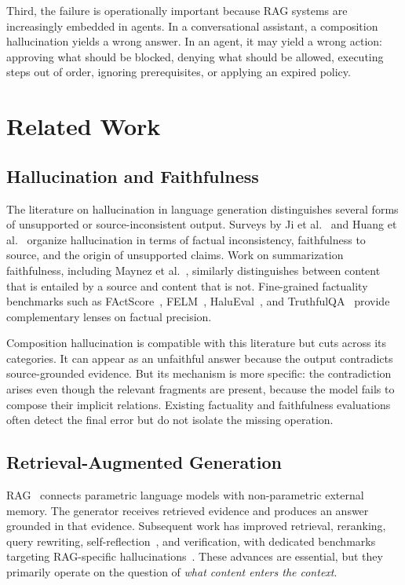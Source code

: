 \documentclass[11pt]{article}
\begin{document}
Third, the failure is operationally important because RAG systems are increasingly embedded in agents. In a conversational assistant, a composition hallucination yields a wrong answer. In an agent, it may yield a wrong action: approving what should be blocked, denying what should be allowed, executing steps out of order, ignoring prerequisites, or applying an expired policy.

\section{Related Work}

\subsection{Hallucination and Faithfulness}

The literature on hallucination in language generation distinguishes several forms of unsupported or source-inconsistent output. Surveys by Ji et al.~\cite{ji2023survey} and Huang et al.~\cite{huang2023hallucination} organize hallucination in terms of factual inconsistency, faithfulness to source, and the origin of unsupported claims. Work on summarization faithfulness, including Maynez et al.~\cite{maynez2020faithfulness}, similarly distinguishes between content that is entailed by a source and content that is not. Fine-grained factuality benchmarks such as FActScore~\cite{min2023factscore}, FELM~\cite{chen2023felm}, HaluEval~\cite{li2023halueval}, and TruthfulQA~\cite{lin2022truthfulqa} provide complementary lenses on factual precision.

Composition hallucination is compatible with this literature but cuts across its categories. It can appear as an unfaithful answer because the output contradicts source-grounded evidence. But its mechanism is more specific: the contradiction arises even though the relevant fragments are present, because the model fails to compose their implicit relations. Existing factuality and faithfulness evaluations often detect the final error but do not isolate the missing operation.

\subsection{Retrieval-Augmented Generation}

RAG~\cite{lewis2020rag} connects parametric language models with non-parametric external memory. The generator receives retrieved evidence and produces an answer grounded in that evidence. Subsequent work has improved retrieval, reranking, query rewriting, self-reflection~\cite{asai2024selfrag}, and verification, with dedicated benchmarks targeting RAG-specific hallucinations~\cite{niu2024ragtruth}. These advances are essential, but they primarily operate on the question of \emph{what content enters the context}.
\end{document}
